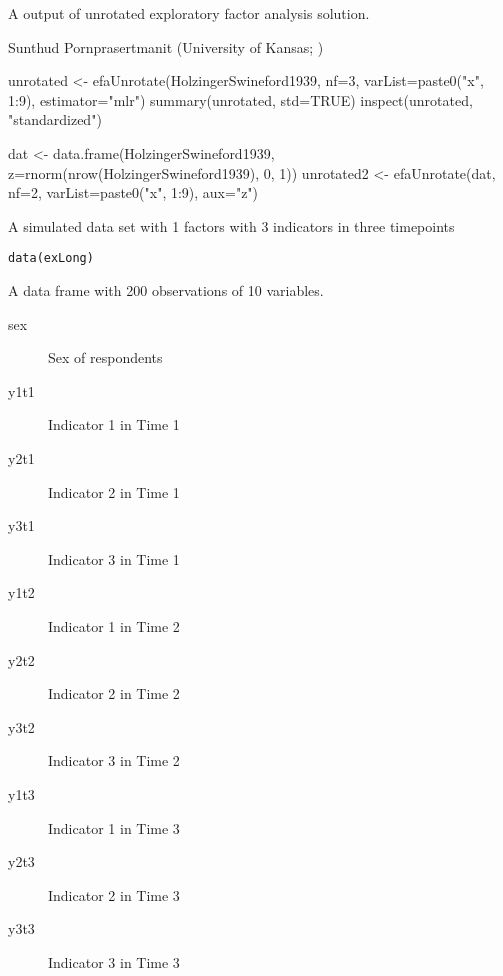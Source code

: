 \documentclass[a4paper]{book}
\begin{document}
%
\begin{Value}
A  output of unrotated exploratory factor analysis solution.
\end{Value}
%
\begin{Author}\relax
Sunthud Pornprasertmanit (University of Kansas; )
\end{Author}
%
\begin{Examples}
\begin{ExampleCode}
unrotated <- efaUnrotate(HolzingerSwineford1939, nf=3, varList=paste0("x", 1:9), estimator="mlr")
summary(unrotated, std=TRUE)
inspect(unrotated, "standardized")

dat <- data.frame(HolzingerSwineford1939, z=rnorm(nrow(HolzingerSwineford1939), 0, 1))
unrotated2 <- efaUnrotate(dat, nf=2, varList=paste0("x", 1:9), aux="z")
\end{ExampleCode}
\end{Examples}
%
\begin{Description}\relax
A simulated data set with 1 factors with 3 indicators in three timepoints
\end{Description}
%
\begin{Usage}
\begin{verbatim}
data(exLong)
\end{verbatim}
\end{Usage}
%
\begin{Format}
A data frame with 200 observations of 10 variables.
\begin{description}

\item[sex] Sex of respondents
\item[y1t1] Indicator 1 in Time 1
\item[y2t1] Indicator 2 in Time 1
\item[y3t1] Indicator 3 in Time 1
\item[y1t2] Indicator 1 in Time 2
\item[y2t2] Indicator 2 in Time 2
\item[y3t2] Indicator 3 in Time 2
\item[y1t3] Indicator 1 in Time 3
\item[y2t3] Indicator 2 in Time 3
\item[y3t3] Indicator 3 in Time 3

\end{description}

\end{Format}
\end{document}
